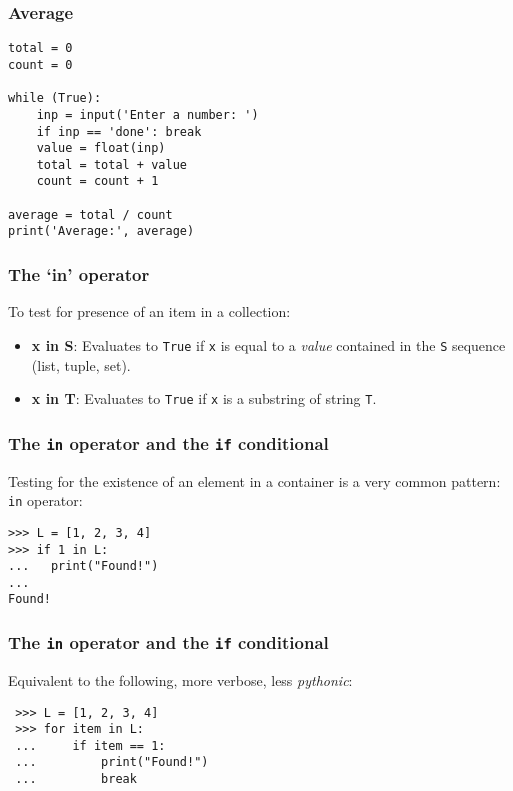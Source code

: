 \begin{frame}[fragile]\frametitle{Average}
  \begin{lstlisting}
total = 0
count = 0

while (True):
	inp = input('Enter a number: ')
	if inp == 'done': break
	value = float(inp)
	total = total + value
	count = count + 1
	
average = total / count
print('Average:', average)
  \end{lstlisting}
\end{frame}


\begin{frame}[fragile]\frametitle{The `{\ttfamily\bfseries in}' operator}

  To test for presence of an item in a collection:

  \begin{itemize}
  \item {\bf x in S}:   Evaluates to \texttt{True} if \texttt{x} is equal to a \emph{value}
    contained in the \texttt{S} sequence (list, tuple, set).
\item {\bf x in T}: Evaluates to \texttt{True} if \texttt{x} is a substring of
    string \texttt{T}.
  \end{itemize}

\end{frame}


\begin{frame}[fragile]\frametitle{The \texttt{in} operator and the \texttt{if} conditional}

  Testing for the existence of an element in a container is a very
  common pattern:
  \texttt{in} operator:

\begin{lstlisting}
>>> L = [1, 2, 3, 4]
>>> if 1 in L:
...   print("Found!")
...
Found!
\end{lstlisting}
\end{frame}


\begin{frame}[fragile]\frametitle{The \texttt{in} operator and the \texttt{if} conditional}

Equivalent to the following, more verbose, less \textit{pythonic}:
 \begin{lstlisting}
 >>> L = [1, 2, 3, 4]
 >>> for item in L:
 ...     if item == 1:
 ...         print("Found!")
 ...         break
 \end{lstlisting}
\end{frame}


